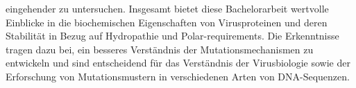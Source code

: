 \documentclass[german,version-2022-01]{uzl-thesis}
\begin{document}
eingehender zu untersuchen. Insgesamt bietet diese Bachelorarbeit wertvolle Einblicke in die biochemischen Eigenschaften von Virusproteinen und deren Stabilit\"at in Bezug auf Hydropathie und Polar-requirements. Die Erkenntnisse tragen dazu bei, ein besseres Verst\"andnis der Mutationsmechanismen zu entwickeln und sind entscheidend f\"ur das Verst\"andnis der Virusbiologie sowie der Erforschung von Mutationsmustern in verschiedenen Arten von DNA-Sequenzen.




%
\end{document}
